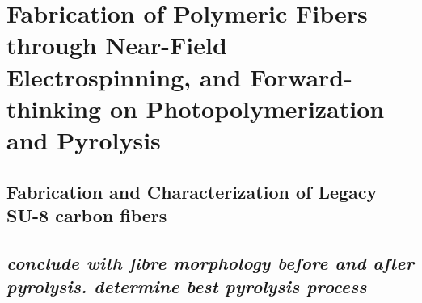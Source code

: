
\chapter{Fabrication of Polymeric Fibers through Near-Field Electrospinning, and Forward-thinking on Photopolymerization and Pyrolysis} %

\label{Chapter:4}

\section{}



\section{}



\section{Fabrication and Characterization of Legacy SU-8 carbon fibers}



\section{\emph{conclude with fibre morphology before and after pyrolysis. determine best pyrolysis process}}
